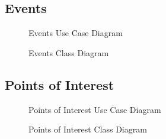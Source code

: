 \documentclass[11pt]{article}
\begin{document}
	\subsection{Events}
	\begin{figure}[!h]
        \centering
        \caption{Events Use Case Diagram}
        \label{fig:events_use_case}
    \end{figure}
    \begin{figure}[!h]
        \centering
        \caption{Events Class Diagram}
        \label{fig:events_class}
    \end{figure}
	\subsection{Points of Interest}
	\begin{figure}[!h]
        \centering
        \caption{Points of Interest Use Case Diagram}
        \label{fig:poi_use_case}
    \end{figure}
    \begin{figure}[!h]
        \centering
        \caption{Points of Interest Class Diagram}
        \label{fig:poi_class}
    \end{figure}
\end{document}
